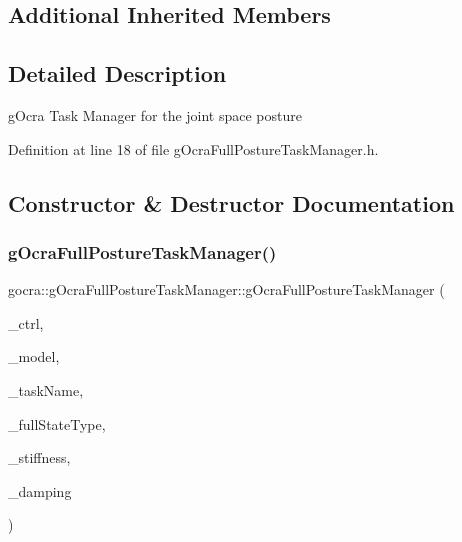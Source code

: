 \subsection*{Additional Inherited Members}


\subsection{Detailed Description}
g\+Ocra Task Manager for the joint space posture 



Definition at line 18 of file g\+Ocra\+Full\+Posture\+Task\+Manager.\+h.



\subsection{Constructor \& Destructor Documentation}
\hypertarget{classgocra_1_1gOcraFullPostureTaskManager_a71c039da046e968235f40e53838018c0}{}\label{classgocra_1_1gOcraFullPostureTaskManager_a71c039da046e968235f40e53838018c0} 
\subsubsection{\texorpdfstring{g\+Ocra\+Full\+Posture\+Task\+Manager()}{gOcraFullPostureTaskManager()}\hspace{0.1cm}{\footnotesize\ttfamily [1/2]}}
{\footnotesize\ttfamily gocra\+::g\+Ocra\+Full\+Posture\+Task\+Manager\+::g\+Ocra\+Full\+Posture\+Task\+Manager (\begin{DoxyParamCaption}\item[{\hyperlink{classgocra_1_1GHCJTController}{G\+H\+C\+J\+T\+Controller} \&}]{\+\_\+ctrl,  }\item[{const ocra\+::\+Model \&}]{\+\_\+model,  }\item[{const std\+::string \&}]{\+\_\+task\+Name,  }\item[{int}]{\+\_\+full\+State\+Type,  }\item[{double}]{\+\_\+stiffness,  }\item[{double}]{\+\_\+damping }\end{DoxyParamCaption})}

